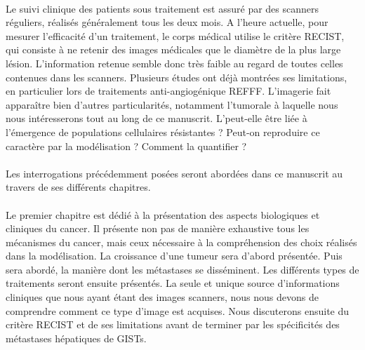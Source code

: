 \documentclass[main.tex]{subfiles}
\begin{document}
\paragraph{}
Le suivi clinique des patients sous traitement est assuré par des scanners réguliers, réalisés généralement tous les deux mois.  
A l'heure actuelle, pour mesurer l'efficacité d'un traitement, le corps médical utilise le critère RECIST, qui consiste à ne retenir des images médicales que le diamètre de la plus large lésion. L'information retenue semble donc très faible au regard de toutes celles contenues dans les scanners. Plusieurs études ont déjà montrées ses limitations, en particulier lors de traitements anti-angiogénique REFFF. L'imagerie fait apparaître bien d'autres particularités, notamment l'\hetero tumorale à laquelle nous nous intéresserons tout au long de ce manuscrit. L'\hetero peut-elle être liée à l'émergence de populations cellulaires résistantes ? Peut-on reproduire ce caractère par la modélisation ? Comment la quantifier ?



\paragraph{}
Les interrogations précédemment posées seront abordées dans ce manuscrit au travers de ses différents chapitres. 

\paragraph{}
Le premier chapitre est dédié à la présentation des aspects biologiques et cliniques du cancer.  Il présente non pas de manière exhaustive tous les mécanismes du cancer, mais ceux nécessaire à la compréhension des choix réalisés dans la modélisation. La croissance d'une tumeur sera d'abord présentée. Puis sera abordé, la manière dont les métastases se disséminent. Les différents types de traitements seront ensuite présentés. La seule et unique source d'informations cliniques que nous ayant étant des images scanners, nous nous devons de comprendre comment ce type d'image est acquises. Nous discuterons ensuite du critère RECIST et de ses limitations avant de terminer par les spécificités des métastases hépatiques de GISTs.
\end{document}
